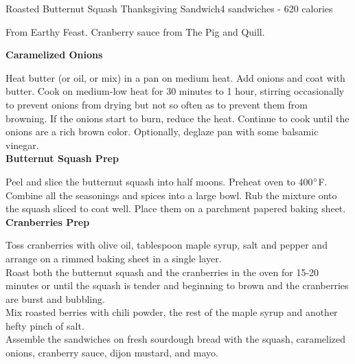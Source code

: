 \begin{recipe}{Roasted Butternut Squash Thanksgiving Sandwich}{4 sandwiches - 620 calories}{}

\freeform From Earthy Feast. Cranberry sauce from The Pig and Quill.


\textbf{Caramelized Onions}

Heat butter (or oil, or mix) in a pan on medium heat. Add onions and coat with butter. Cook on medium-low heat for 30 minutes to 1 hour, stirring occasionally to prevent onions from drying but not so often as to prevent them from browning. If the onions start to burn, reduce the heat. Continue to cook until the onions are a rich brown color. Optionally, deglaze pan with some balsamic vinegar.\\

\textbf{Butternut Squash Prep}

Peel and slice the butternut squash into half moons. Preheat oven to 400$\degree$F. Combine all the seasonings and spices into a large bowl. Rub the mixture onto the squash sliced to coat well. Place them on a parchment papered baking sheet.\\

\textbf{Cranberries Prep}

Toss cranberries with olive oil,  tablespoon maple syrup, salt and pepper and arrange on a rimmed baking sheet in a single layer.\\

Roast both the butternut squash and the cranberries in the oven for 15-20 minutes or until the squash is tender and beginning to brown and the cranberries are burst and bubbling.\\

Mix roasted berries with chili powder, the rest of the maple syrup and another hefty pinch of salt.\\

Assemble the sandwiches on fresh sourdough bread with the squash, caramelized onions, cranberry sauce, dijon mustard, and mayo.

\end{recipe}